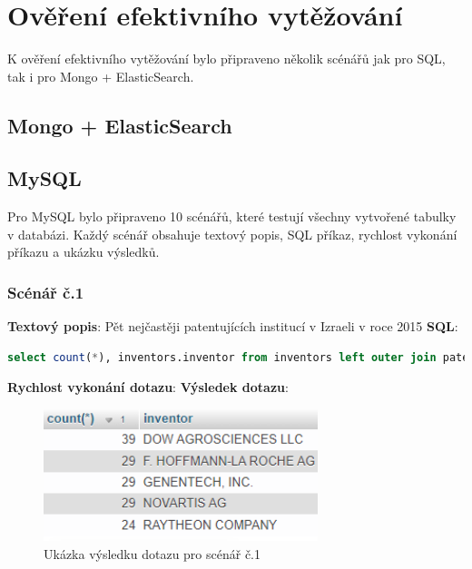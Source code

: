 
\chapter{Ověření efektivního vytěžování}
K ověření efektivního vytěžování bylo připraveno několik scénářů jak pro SQL, tak i pro Mongo + ElasticSearch.
\section{Mongo + ElasticSearch}
\section{MySQL}
Pro MySQL bylo připraveno 10 scénářů, které testují všechny vytvořené tabulky v databázi. Každý scénář obsahuje textový popis, SQL příkaz, rychlost vykonání příkazu a ukázku výsledků.

\subsection{Scénář č.1}
\textbf{Textový popis}: Pět nejčastěji patentujících institucí v Izraeli v roce 2015
\newline
\textbf{SQL}: 
\begin{lstlisting}[language=SQL, breaklines=true, frame=single, label = {lst:elements_a}, captionpos=b]
select count(*), inventors.inventor from inventors left outer join patents on inventors.id_patent = patents.id where YEAR(patents.patent_date) = 2015 and patents.patent_id like '%IL%' group by inventors.inventor order by count(*) desc LIMIT 5;
\end{lstlisting}
\textbf{Rychlost vykonání dotazu}: 
\newline
\textbf{Výsledek dotazu}:
\begin{figure}[h!]
\centering
\includegraphics[width=8cm]{img/scenare/scenar_1}
\caption{Ukázka výsledku dotazu pro scénář č.1}
\label{fig:scenar1}
\end{figure}


